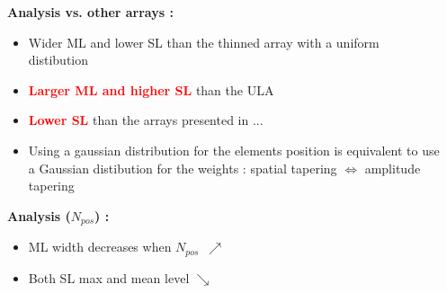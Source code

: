 \documentclass[UKenglish,8pt,aspectratio=1610]{beamer}
\begin{document}
\begin{frame}
\begin{columns}
\begin{column}{0.7\textwidth}
		\end{column}
		
		\begin{column}{0.25\textwidth}
			\textbf{Analysis vs. other arrays :}
			\begin{itemize}
				\item Wider ML and lower SL than the thinned array with a uniform distibution
				\item \textcolor{red}{\textbf{Larger ML and higher SL}} than the ULA
				\item \textcolor{red}{\textbf{Lower SL}} than the arrays presented in \cite{Optimization_of_sparse_arrays}...
				\item Using a gaussian distribution for the elements position is equivalent to use a Gaussian distibution for the weights : spatial tapering $\Longleftrightarrow$ amplitude tapering 
			\end{itemize}
			\textbf{Analysis ($N_{pos}$) : }
			\begin{itemize}
				\item ML width decreases when $N_{pos}$~$\nearrow$
				\item Both SL max and mean level $\searrow$
			\end{itemize}
			
		\end{column}
	\end{columns}
	
	
	
	
	
\end{frame}
\end{document}
